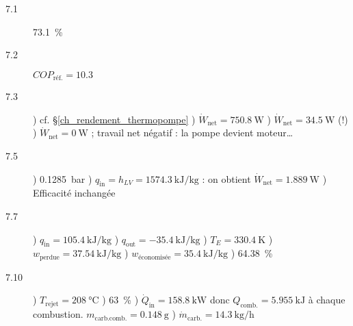 	\begin{description}
		\item [7.1] \tab \SI{73,1}{\percent}
		\item [7.2] \tab $COP_\text{réf.} = \num{10,3}$
		\item [7.3] ) cf. \S\ref{ch_rendement_thermopompe}	
						) $\dot{W}_\text{net} = \SI{750,8}{\watt}$ 
						) $\dot{W}_\text{net} = \SI{34,5}{\watt}$ (!) 
						) $\dot{W}_\text{net} = \SI{0}{\watt}$ ; travail net négatif : la pompe devient moteur…
		\item [7.5] ) \SI{0,1285}{\bar} 
						) ${q}_\text{in} = h_{LV} = \SI{1574,3}{\kilo\joule\per\kilogram}$ : on obtient $\dot{W}_\text{net} = \SI{1,889}{\watt}$ 
						) Efficacité inchangée
		\item [7.7] ) ${q}_\text{in} = \SI{105,4}{\kilo\joule\per\kilogram}$ 
						) ${q}_\text{out} = \SI{-35,4}{\kilo\joule\per\kilogram}$ 
						) ${T}_{E} = \SI{330,4}{\kelvin}$ 
						) ${w}_\text{perdue} = \SI{37,54}{\kilo\joule\per\kilogram}$ 
						) ${w}_\text{économisée} = \SI{+35,4}{\kilo\joule\per\kilogram}$ 
						) \SI{64,38}{\percent}
		\item [7.10] 	) ${T}_\text{rejet} = \SI{208}{\degreeCelsius}$ 
							) \SI{63}{\percent} 
							) $\dot{Q}_\text{in} = \SI{158,8}{\kilo\watt}$ donc ${Q}_\text{comb.} = \SI{5,955}{\kilo\joule}$ à chaque combustion. ${m}_\text{carb.comb.} = \SI{0,148}{\gram}$ 
							) $\dot{m}_\text{carb.} = \SI{14,3}{\kilogram\per\hour}$
	\end{description}
